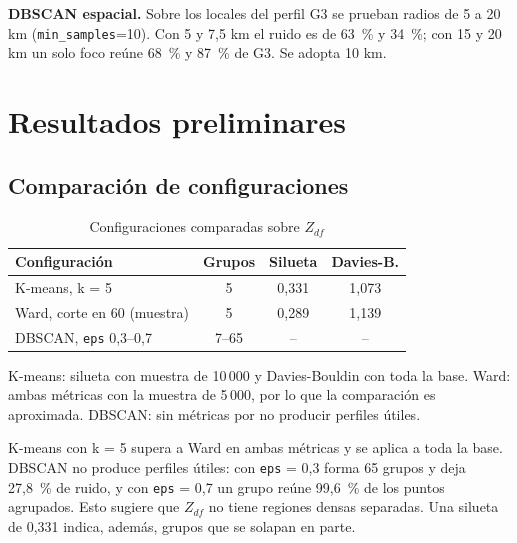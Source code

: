 \documentclass[conference]{IEEEtran}
\begin{document}
\textbf{DBSCAN espacial.} Sobre los locales del perfil G3 se prueban radios de 5 a 20 km (\texttt{min\_samples}=10). Con 5 y 7,5 km el ruido es de 63~\% y 34~\%; con 15 y 20 km un solo foco reúne 68~\% y 87~\% de G3. Se adopta 10 km.

\section{Resultados preliminares}
\subsection{Comparación de configuraciones}
\begin{table}[htbp]
\caption{Configuraciones comparadas sobre $Z_{df}$}
\centering
\small
\begin{tabular}{lccc}
\toprule
Configuración & Grupos & Silueta & Davies-B. \\
\midrule
K-means, k = 5 & 5 & 0,331 & 1,073 \\
Ward, corte en 60 (muestra) & 5 & 0,289 & 1,139 \\
DBSCAN, \texttt{eps} 0,3--0,7 & 7--65 & -- & -- \\
\bottomrule
\end{tabular}
\label{tab:configuraciones}

\smallskip
\footnotesize K-means: silueta con muestra de 10\,000 y Davies-Bouldin con toda la base. Ward: ambas métricas con la muestra de 5\,000, por lo que la comparación es aproximada. DBSCAN: sin métricas por no producir perfiles útiles.
\end{table}

K-means con k = 5 supera a Ward en ambas métricas y se aplica a toda la base. DBSCAN no produce perfiles útiles: con \texttt{eps} = 0,3 forma 65 grupos y deja 27,8~\% de ruido, y con \texttt{eps} = 0,7 un grupo reúne 99,6~\% de los puntos agrupados. Esto sugiere que $Z_{df}$ no tiene regiones densas separadas. Una silueta de 0,331 indica, además, grupos que se solapan en parte.
\end{document}
